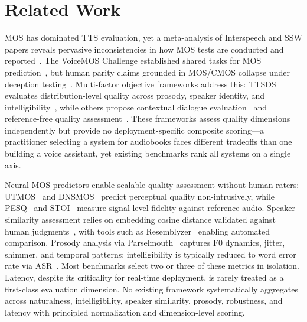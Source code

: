 \section{Related Work}

MOS has dominated TTS evaluation, yet a meta-analysis of Interspeech and SSW papers reveals
pervasive inconsistencies in how MOS tests are conducted and
reported~\cite{kirkland2023mos}. The VoiceMOS Challenge established shared
tasks for MOS prediction~\cite{huang2022voicemos,huang2024voicemos}, but
human parity claims grounded in MOS/CMOS collapse under deception
testing~\cite{srinivasavaradhan2025statetts}. Multi-factor objective
frameworks address this: TTSDS evaluates distribution-level quality across
prosody, speaker identity, and
intelligibility~\cite{minixhofer2024ttsds,minixhofer2025ttsds2}, while others
propose contextual dialogue evaluation~\cite{wang2024contextual} and
reference-free quality assessment~\cite{manocha2021noresqa}. These frameworks
assess quality dimensions independently but provide no deployment-specific
composite scoring---a practitioner selecting a system for audiobooks faces
different tradeoffs than one building a voice assistant, yet existing
benchmarks rank all systems on a single axis.

Neural MOS predictors enable scalable quality assessment without human raters:
UTMOS~\cite{saeki2022utmos} and DNSMOS~\cite{reddy2021dnsmos} predict
perceptual quality non-intrusively, while PESQ~\cite{itu2001pesq} and
STOI~\cite{taal2011stoi} measure signal-level fidelity against reference
audio. Speaker similarity assessment relies on embedding cosine distance
validated against human judgments~\cite{deja2022calibrated}, with tools such
as Resemblyzer~\cite{jemine2019resemblyzer} enabling automated comparison.
Prosody analysis via Parselmouth~\cite{jadoul2018parselmouth} captures F0
dynamics, jitter, shimmer, and temporal patterns; intelligibility is typically
reduced to word error rate via ASR~\cite{radford2023whisper}. Most benchmarks
select two or three of these metrics in isolation. Latency, despite its
criticality for real-time deployment, is rarely treated as a first-class
evaluation dimension. No existing framework
systematically aggregates across naturalness, intelligibility, speaker
similarity, prosody, robustness, and latency with principled normalization and
dimension-level scoring.

